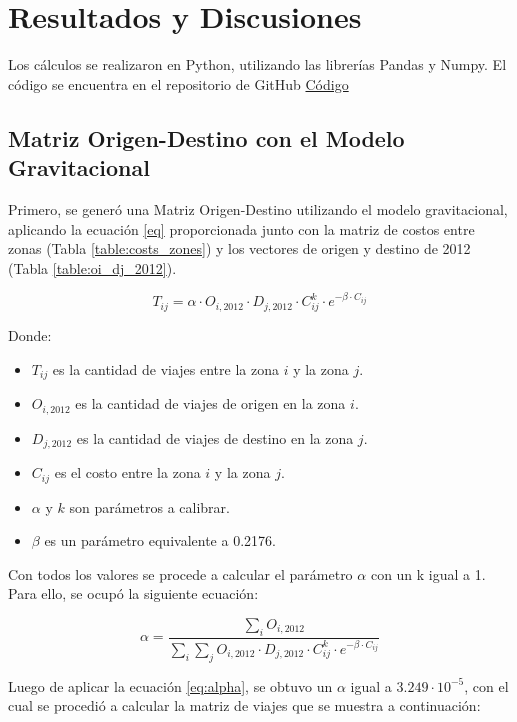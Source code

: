\documentclass[letterpaper,12pt]{article}
\begin{document}
\section{Resultados y Discusiones}
Los cálculos se realizaron en Python, utilizando las librerías Pandas y Numpy. El código se encuentra en el repositorio de GitHub \href{https://github.com/berckanala/T3_autitos/blob/main/t3.py}{Código}
\subsection{Matriz Origen-Destino con el Modelo Gravitacional}
Primero, se generó una Matriz Origen-Destino utilizando el modelo gravitacional, aplicando la ecuación \ref{eq} proporcionada junto con la matriz de costos entre zonas (Tabla \ref{table:costs_zones}) y los vectores de origen y destino de 2012 (Tabla \ref{table:oi_dj_2012}).

\begin{equation}
    T_{ij} = \alpha \cdot O_{i,2012} \cdot D_{j,2012} \cdot C_{ij}^k \cdot e^{-\beta \cdot C_{ij}}
    \label{eq}
\end{equation}

Donde:
\begin{itemize}
    \item $T_{ij}$ es la cantidad de viajes entre la zona $i$ y la zona $j$.
    \item $O_{i,2012}$ es la cantidad de viajes de origen en la zona $i$.
    \item $D_{j,2012}$ es la cantidad de viajes de destino en la zona $j$.
    \item $C_{ij}$ es el costo entre la zona $i$ y la zona $j$.
    \item $\alpha$ y $k$ son parámetros a calibrar.
    \item $\beta$ es un parámetro equivalente a 0.2176.
\end{itemize}



Con todos los valores se procede a calcular el parámetro $\alpha$ con un k igual a 1. Para ello, se ocupó la siguiente ecuación:

\begin{equation}
    \alpha = \frac{\sum_i O_{i,2012}}{\sum_i \sum_j O_{i,2012} \cdot D_{j,2012} \cdot C_{ij}^k \cdot e^{-\beta \cdot C_{ij}}}
    \label{eq:alpha}
\end{equation}

Luego de aplicar la ecuación \ref{eq:alpha}, se obtuvo un  $\alpha$ igual a $3.249 \cdot 10^{-5}$, con el cual se procedió a calcular la matriz de viajes que se muestra a continuación:
\end{document}
